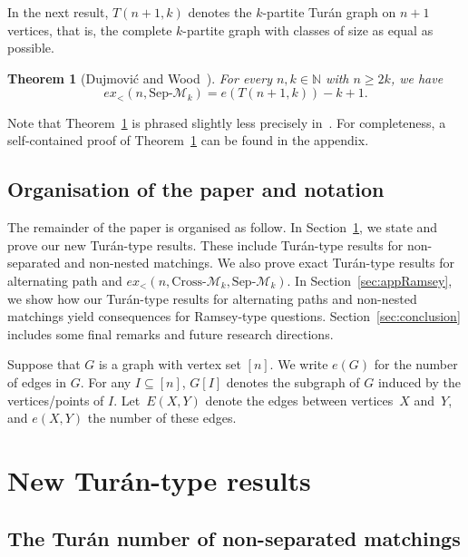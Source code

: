 \documentclass[11pt]{article}
\newtheorem{theorem}{Theorem}[section]
\theoremstyle{definition}
\begin{document}
In the next result, $T(n+1,k)$ denotes the $k$-partite Tur\'an graph on $n+1$ vertices, that is, the complete $k$-partite graph with classes of size as equal as possible.

\begin{theorem}[Dujmovi\'c and Wood~\cite{layout}]\label{dwsepar}
For every $n,k\in\mathbb N$ with $n\ge 2k$, we have
$$ex_<(n,\text{Sep-}\mathcal M_k)=e(T(n+1,k))-k+1.$$
\end{theorem}
Note that Theorem~\ref{dwsepar} is phrased slightly less precisely in~\cite{layout}.
For completeness, a self-contained proof of Theorem~\ref{dwsepar} can be found in the appendix.

\subsection{Organisation of the paper and notation}
The remainder of the paper is organised as follow.
In Section~\ref{sec:newresults}, we state and prove our new Tur\'an-type results.
These include Tur\'an-type results for non-separated and non-nested matchings.
We also prove exact Tur\'an-type results for alternating path and $ex_<(n,\text{Cross-}\mathcal M_k,\text{Sep-}\mathcal M_k)$.
In Section~\ref{sec:appRamsey}, we show how our Tur\'an-type results for alternating paths and non-nested matchings yield consequences for Ramsey-type questions.
Section~\ref{sec:conclusion} includes some final remarks and future research directions. 

\smallskip

 Suppose that $G$ is a graph with vertex set $[n]$. 
We write $e(G)$ for the number of edges in $G$.
For any $I\subseteq [n]$, 
$G[I]$ denotes 
the subgraph of $G$ induced by the vertices/points of $I$. 
Let~$E(X,Y)$ denote the edges between vertices~$X$ and~$Y$, and $e(X,Y)$ the number of these edges. 

\section{New Tur\'an-type results}\label{sec:newresults}

\subsection{The Tur\'an number of non-separated matchings}
\end{document}
